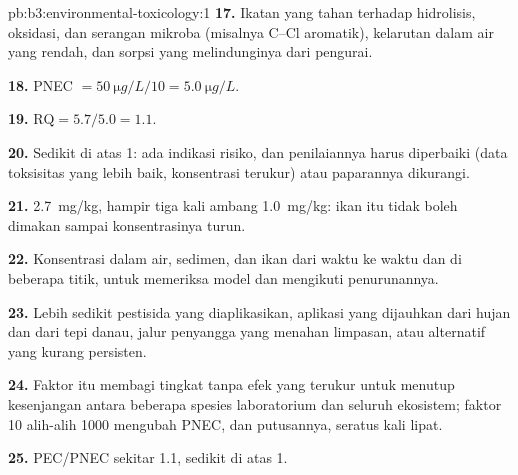 \begin{solution}{pb:b3:environmental-toxicology:1}
\textbf{17.} Ikatan yang tahan terhadap hidrolisis, oksidasi, dan serangan mikroba (misalnya C--Cl
aromatik), kelarutan dalam air yang rendah, dan sorpsi yang melindunginya dari
pengurai.

\textbf{18.} PNEC $= \qty{50}{\micro g/L}/10 = \qty{5.0}{\micro g/L}$.

\textbf{19.} $\mathrm{RQ} = 5.7/5.0 = 1.1$.

\textbf{20.} Sedikit di atas 1: ada indikasi risiko, dan penilaiannya harus diperbaiki (data
toksisitas yang lebih baik, konsentrasi terukur) atau paparannya dikurangi.

\textbf{21.} \qty{2.7}{mg/kg}, hampir tiga kali ambang \qty{1.0}{mg/kg}: ikan itu tidak boleh dimakan
sampai konsentrasinya turun.

\textbf{22.} Konsentrasi dalam air, sedimen, dan ikan dari waktu ke waktu dan di beberapa titik,
untuk memeriksa model dan mengikuti penurunannya.

\textbf{23.} Lebih sedikit pestisida yang diaplikasikan, aplikasi yang dijauhkan dari hujan dan dari tepi danau,
jalur penyangga yang menahan limpasan, atau alternatif yang kurang persisten.

\textbf{24.} Faktor itu membagi tingkat tanpa efek yang terukur untuk menutup kesenjangan antara beberapa
spesies laboratorium dan seluruh ekosistem; faktor 10 alih-alih 1000 mengubah
PNEC, dan putusannya, seratus kali lipat.

\textbf{25.}  PEC/PNEC sekitar 1.1, sedikit di atas 1.
\end{solution}
